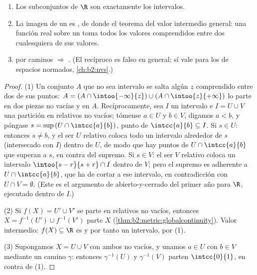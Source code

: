\begin{theorem}\label{thm:b2:metric:connectedness}
\begin{enumerate}
  \item Los subconjuntos  de $\R$ son exactamente los
        intervalos.
  \item La imagen  de un  es , de donde
        el teorema del valor intermedio general: una función real
         sobre un  toma todos los valores
        comprendidos entre dos cualesquiera de sus valores.
  \item {} por caminos $\Rightarrow$ . (El recíproco es
        falso en general; sí vale para los  de espacios
        normados, \cref{ch:b2:nvs}.)
\end{enumerate}
\end{theorem}

\begin{proof}
(1) Un conjunto $A$ que no sea intervalo se salta algún $z$
comprendido entre dos de sus puntos: $A = (A \cap
\intoo{-\infty}{z}) \cup (A \cap \intoo{z}{+\infty})$ lo parte en dos
piezas no vacías y  en $A$. Recíprocamente, sea $I$ un
intervalo e $I = U \cup V$ una partición en  relativos no
vacíos; tómense $a \in U$ y $b \in V$, digamos $a < b$, y póngase $s
= \sup\,(U \cap \intcc{a}{b})$, punto de $\intcc{a}{b} \subseteq I$.
Si $s \in U$: entonces $s \neq b$, y el ser $U$  relativo
coloca todo un intervalo alrededor de $s$ (intersecado con $I$)
dentro de $U$, de modo que hay puntos de $U \cap \intcc{a}{b}$ que
superan a $s$, en contra del supremo. Si $s \in V$: el ser $V$
 relativo coloca un intervalo $\intoo{s - r}{s + r} \cap I$
dentro de $V$; pero el supremo es adherente a $U \cap \intcc{a}{b}$,
que ha de cortar a ese intervalo, en contradicción con $U \cap V =
\emptyset$. (Este es el argumento de abierto-y-cerrado del primer año
para $\R$, ejecutado dentro de $I$.)

(2) Si $f(X) = U' \cup V'$ se parte en  relativos no vacíos,
entonces $X = f^{-1}(U') \cup f^{-1}(V')$ parte $X$
(\cref{thm:b2:metric:globalcontinuity}). Valor intermedio: $f(X)
\subseteq \R$ es  y por tanto un intervalo, por (1).

(3) Supongamos $X = U \cup V$ con ambos  no vacíos, y unamos
$a \in U$ con $b \in V$ mediante un camino $\gamma$: entonces
$\gamma^{-1}(U)$ y $\gamma^{-1}(V)$ parten $\intcc{0}{1}$, en contra
de (1).
\end{proof}

